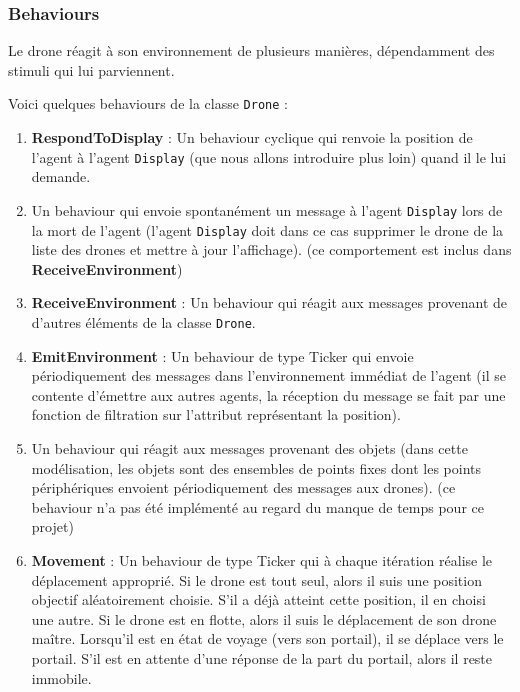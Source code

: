 \documentclass[11pt]{report}
\begin{document}
\subsubsection{Behaviours} 

Le drone réagit à son environnement de plusieurs manières, dépendamment des stimuli qui lui parviennent. 

Voici quelques behaviours de la classe \verb|Drone| :

\begin{enumerate}
\item \textbf{RespondToDisplay} : Un behaviour cyclique qui renvoie la position de l'agent à l'agent \verb|Display| (que nous allons introduire plus loin) quand il le lui demande.

\item Un behaviour qui envoie spontanément un message à l'agent \verb|Display| lors de la mort de l'agent (l'agent \verb|Display| doit dans ce cas supprimer le drone de la liste des drones et mettre à jour l'affichage). (ce comportement est inclus dans \textbf{ReceiveEnvironment})

\item \textbf{ReceiveEnvironment} : Un behaviour qui réagit aux messages provenant de d'autres éléments de la classe \verb|Drone|.

\item \textbf{EmitEnvironment} : Un behaviour de type Ticker qui envoie périodiquement des messages dans l'environnement immédiat de l'agent (il se contente d'émettre aux autres agents, la réception du message se fait par une fonction de filtration sur l'attribut représentant la position).

\item Un behaviour qui réagit aux messages provenant des objets (dans cette modélisation, les objets sont des ensembles de points fixes dont les points périphériques envoient périodiquement des messages aux drones). (ce behaviour n'a pas été implémenté au regard du manque de temps pour ce projet)

\item \textbf{Movement} : Un behaviour de type Ticker qui à chaque itération réalise le déplacement approprié. Si le drone est tout seul, alors il suis une position objectif aléatoirement choisie. S'il a déjà atteint cette position, il en choisi une autre. Si le drone est en flotte, alors il suis le déplacement de son drone maître. Lorsqu'il est en état de voyage (vers son portail), il se déplace vers le portail. S'il est en attente d'une réponse de la part du portail, alors il reste immobile.


\end{enumerate}
\end{document}
